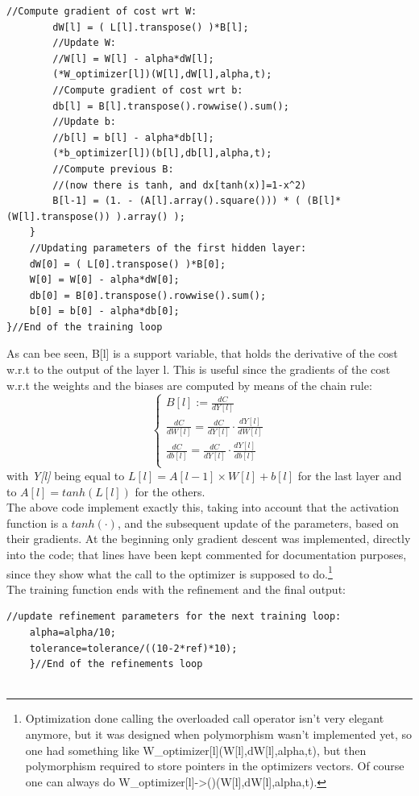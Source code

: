 \documentclass[12pt, a4paper]{report}
\theoremstyle{definition}
\begin{document}
{\begin{lstlisting}[frame=single]
		//Compute gradient of cost wrt W:
		dW[l] = ( L[l].transpose() )*B[l];
		//Update W:
		//W[l] = W[l] - alpha*dW[l];
		(*W_optimizer[l])(W[l],dW[l],alpha,t);
		//Compute gradient of cost wrt b:
		db[l] = B[l].transpose().rowwise().sum();
		//Update b:
		//b[l] = b[l] - alpha*db[l];
		(*b_optimizer[l])(b[l],db[l],alpha,t);
		//Compute previous B: 
		//(now there is tanh, and dx[tanh(x)]=1-x^2)
		B[l-1] = (1. - (A[l].array().square())) * ( (B[l]* (W[l].transpose()) ).array() );
	}
	//Updating parameters of the first hidden layer:
	dW[0] = ( L[0].transpose() )*B[0];
	W[0] = W[0] - alpha*dW[0];
	db[0] = B[0].transpose().rowwise().sum();
	b[0] = b[0] - alpha*db[0];
}//End of the training loop
\end{lstlisting}
\noindent As can bee seen, {\ttfamily B[l]} is a support variable, that holds the derivative of the cost w.r.t to the output of the layer {\ttfamily l}. This is useful since the gradients of the cost w.r.t the weights and the biases are computed by means of the chain rule:
\begin{equation*}
	\begin{cases}
	B[l] := \frac{dC}{dY[l]}\\ 
	\frac{dC}{dW[l]} = \frac{dC}{dY[l]} \cdot \frac{dY[l]}{dW[l]} \\
	\frac{dC}{db[l]} = \frac{dC}{dY[l]} \cdot \frac{dY[l]}{db[l]} \\
	\end{cases}
\end{equation*} 
with \textit{Y[l]} being equal to $L[l]=A[l-1]\times W[l]+b[l]$ for the last layer and to $A[l]=tanh(L[l])$ for the others.\\
The above code implement exactly this, taking into account that the activation function is a $tanh(\cdot)$, and the subsequent update of the parameters, based on their gradients. At the beginning only gradient descent was implemented, directly into the code; that lines have been kept commented for documentation purposes, since they show what the call to the optimizer is supposed to do.\footnote{Optimization done calling the overloaded call operator isn't very elegant anymore, but it was designed when polymorphism wasn't implemented yet, so one had something like {\ttfamily W\_optimizer[l](W[l],dW[l],alpha,t)}, but then polymorphism required to store pointers in the optimizers vectors. Of course one can always do {\ttfamily W\_optimizer[l]->()(W[l],dW[l],alpha,t)}.}\\
The training function ends with the refinement and the final output:
\begin{lstlisting}[frame=single, showstringspaces=false]
	//update refinement parameters for the next training loop:
	alpha=alpha/10;
	tolerance=tolerance/((10-2*ref)*10);
	}//End of the refinements loop


\end{lstlisting}}
\end{document}
